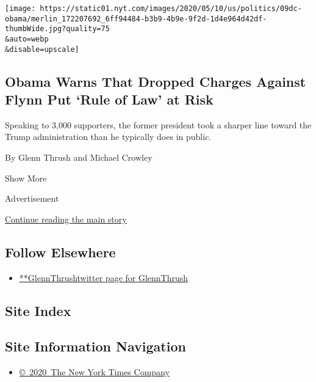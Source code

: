 \begin{enumerate}
  \texttt{[image: https://static01.nyt.com/images/2020/05/10/us/politics/09dc-obama/merlin\_172207692\_6ff94484-b3b9-4b9e-9f2d-1d4e964d42df-thumbWide.jpg?quality=75\\\&auto=webp\\\&disable=upscale]}

  \hypertarget{obama-warns-that-dropped-charges-against-flynn-put-rule-of-law-at-risk}{%
  \subsection{Obama Warns That Dropped Charges Against Flynn Put `Rule
  of Law' at
  Risk}\label{obama-warns-that-dropped-charges-against-flynn-put-rule-of-law-at-risk}}

  Speaking to 3,000 supporters, the former president took a sharper line
  toward the Trump administration than he typically does in public.

  By Glenn Thrush and Michael Crowley
\end{enumerate}

Show More

Advertisement

\protect\hyperlink{after-mid2}{Continue reading the main story}

\hypertarget{follow-elsewhere}{%
\subsection{Follow Elsewhere}\label{follow-elsewhere}}

\begin{itemize}
\tightlist
\item
  \href{https://twitter.com/GlennThrush}{**GlennThrushtwitter page for
  GlennThrush}
\end{itemize}

\hypertarget{site-index}{%
\subsection{Site Index}\label{site-index}}

\hypertarget{site-information-navigation}{%
\subsection{Site Information
Navigation}\label{site-information-navigation}}

\begin{itemize}
\tightlist
\item
  \href{https://help.nytimes.com/hc/en-us/articles/115014792127-Copyright-notice}{©~2020~The
  New York Times Company}
\end{itemize}

